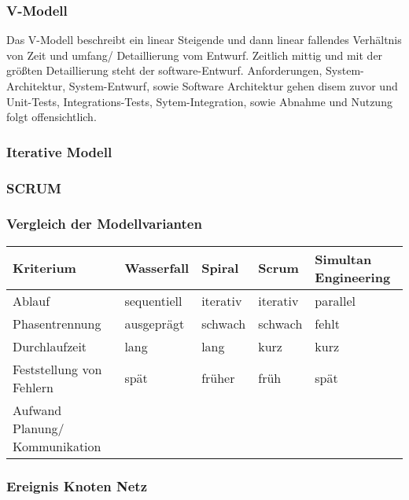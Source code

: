 \subsubsection{V-Modell}

Das V-Modell beschreibt ein linear Steigende und dann linear fallendes Verhältnis von Zeit und umfang/ Detaillierung vom
Entwurf.
Zeitlich mittig und mit der größten Detaillierung steht der software-Entwurf.
Anforderungen, System-Architektur, System-Entwurf, sowie Software Architektur gehen disem zuvor und
Unit-Tests, Integrations-Tests, Sytem-Integration, sowie Abnahme und Nutzung folgt offensichtlich.

\subsubsection{Iterative Modell}

\subsubsection{SCRUM}

\subsubsection{Vergleich der Modellvarianten}
\begin{tabular}{l|llll}
    Kriterium                           & Wasserfall            & Spiral        & Scrum         & Simultan Engineering\\
    \hline
    Ablauf                              & sequentiell           & iterativ      & iterativ      & parallel\\
    \hline
    Phasentrennung                      & ausgeprägt            & schwach       & schwach       & fehlt\\
    \hline
    Durchlaufzeit                       & lang                  & lang          & kurz          & kurz\\
    \hline
    Feststellung von Fehlern            & spät                  & früher        & früh          & spät\\
    \hline
    Aufwand Planung/ Kommunikation\\
\end{tabular}

\subsubsection{Ereignis Knoten Netz}


